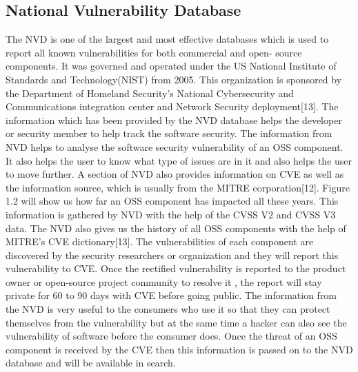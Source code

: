 \subsection{National Vulnerability Database}
The \acs{NVD} is one of the largest and most effective databases which is used to report all known vulnerabilities for both commercial and open- source components. It was governed and operated under the US National Institute of Standards and Technology(NIST) from 2005. This organization is sponsored by the Department of Homeland Security's National Cybersecurity and Communications integration center and Network Security deployment[13]. The information which has been provided by the \acs{NVD} database helps the developer or security member to help track the software security. The information from \acs{NVD} helps to analyse the software security vulnerability of an \acs{OSS} component. It also helps the user to know what type of issues are in it and also helps the user to move further. A section of \acs{NVD} also provides information on \acs{CVE} as well as the information source, which is usually from the MITRE corporation[12]. Figure 1.2 will show us how far an \acs{OSS} component has impacted all these years. This information is gathered by \acs{NVD} with the help of the CVSS V2 and CVSS V3 data. The \acs{NVD} also gives us the history of all \acs{OSS} components with the help of MITRE’s \acs{CVE} dictionary[13]. The vulnerabilities of each component are discovered by the security researchers or organization and they will report this vulnerability to CVE. Once the rectified vulnerability is reported to the product owner or open-source project community to resolve it , the report will stay private for 60 to 90 days with \acs{CVE} before going public. The information from the \acs{NVD} is very useful to the consumers who use it so that they can protect themselves from the vulnerability but at the same time a hacker can also see the vulnerability of software before the consumer does. Once the threat of an \acs{OSS} component is received by the \acs{CVE} then this information is passed on to the \acs{NVD} database and will be available in search.
%
